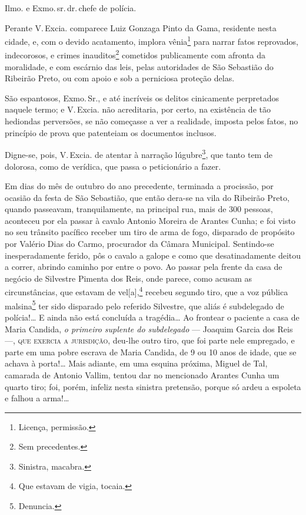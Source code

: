 Ilmo. e Exmo.\,sr.\,dr.\,chefe de polícia.

Perante V.\,Excia. comparece Luiz Gonzaga Pinto da Gama, residente nesta
cidade, e, com o devido acatamento, implora vênia\footnote{ Licença,
  permissão.} para narrar fatos reprovados, indecorosos, e crimes
inauditos\footnote{ Sem precedentes.} cometidos publicamente com
afronta da moralidade, e com escárnio das leis, pelas autoridades de São
Sebastião do Ribeirão Preto, ou com apoio e sob a perniciosa proteção
delas.

São espantosos, Exmo.\,Sr., e até incríveis os delitos cinicamente
perpretados naquele termo; e V.\,Excia. não acreditaria, por certo, na
existência de tão hediondas perversões, se não começasse a ver a
realidade, imposta pelos fatos, no princípio de prova que patenteiam os
documentos inclusos.

Digne-se, pois, V.\,Excia. de atentar à narração lúgubre\footnote{
  Sinistra, macabra.}, que tanto tem de dolorosa, como de verídica, que
passa o peticionário a fazer.

Em dias do mês de outubro do ano precedente, terminada a procissão, por
ocasião da festa de São Sebastião, que então dera-se na vila do Ribeirão
Preto, quando passeavam, tranquilamente, na principal rua, mais de 300
pessoas, aconteceu por ela passar à cavalo Antonio Moreira de Arantes
Cunha; e foi visto no seu trânsito pacífico receber um tiro de arma de
fogo, disparado de propósito por Valério Dias do Carmo, procurador da
Câmara Municipal. Sentindo-se inesperadamente ferido, pôs o cavalo a
galope e como que desatinadamente deitou a correr, abrindo caminho por
entre o povo. Ao passar pela frente da casa de negócio de Silvestre
Pimenta dos Reis, onde parece, como acusam as circunstâncias, que
estavam de vel{[}a{]},\footnote{ Que estavam de vigia, tocaia.} recebeu
segundo tiro, que a voz pública malsina\footnote{ Denuncia.} ter sido
disparado pelo referido Silvestre, que aliás é subdelegado de
polícia!\ldots{} E ainda não está concluída a tragédia\ldots{} Ao frontear o
paciente a casa de Maria Candida, \emph{o primeiro suplente do
subdelegado} --- Joaquim Garcia dos Reis ---, \textsc{que exercia a jurisdição},
deu-lhe outro tiro, que foi parte nele empregado, e parte em uma pobre
escrava de Maria Candida, de 9 ou 10 anos de idade, que se achava à
porta!\ldots{} Mais adiante, em uma esquina próxima, Miguel de Tal, camarada
de Antonio Vallim, tentou dar no mencionado Arantes Cunha um quarto
tiro; foi, porém, infeliz nesta sinistra pretensão, porque só ardeu a
espoleta e falhou a arma!\ldots{}

